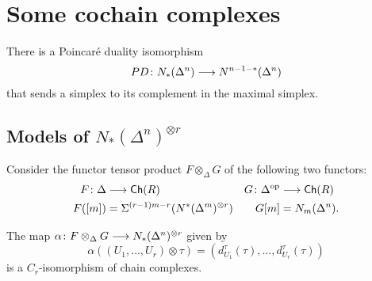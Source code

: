 
\section{Some cochain complexes}

There is a Poincaré duality isomorphism
\[PD\colon N_*(\Delta^n)\longrightarrow N^{n-1-*}(\Delta^n)\]
that sends a simplex to its complement in the maximal simplex.

\subsection{Models of $N_*(\Delta^n)^{\otimes r}$}

Consider the functor tensor product $F\otimes_{\Delta}G$ of the following two functors:
\begin{align*}
	F\colon \Delta&\longrightarrow \mathsf{Ch}(R)& G\colon \Delta^{\mathrm{op}}&\longrightarrow \mathsf{Ch}(R)\\
	F([m])&=\Sigma^{(r-1)m-r}(N^*(\Delta^m)^{\otimes r})& G[m] &= N_m(\Delta^n).
\end{align*}

\begin{lemma}
	The map $\alpha\colon F\otimes_{\Delta} G\longrightarrow N_*(\Delta^n)^{\otimes r}$ given by
	\[\alpha((U_1,\ldots,U_r)\otimes \tau) = (d_{U_1}^\tau(\tau),\ldots, d_{U_r}^\tau(\tau))\]
	is a $C_r$-isomorphism of chain complexes.
\end{lemma}

